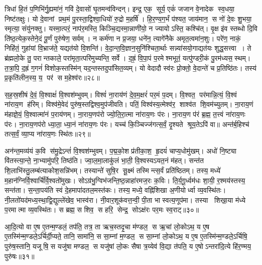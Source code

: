 त्रिधा॑ हि॒तं प॒णिभि॑र्गु॒ह्यमा॑नं॒ गवि॑ दे॒वासो॑ घृ॒तमन्व॑विन्दन्। 
इन्द्र॒ एक॒ सूर्य॒ एकं॑ जजान वे॒नादेक स्व॒धया॒ निष्ट॑तक्षुः। 
यो दे॒वानां प्रथ॒मं पु॒रस्ता॒द्विश्वा॒धियो॑ रु॒द्रो म॒हर्\mbox{}षि॑। 
हि॒र॒ण्य॒ग॒र्भं प॑श्यत॒ जाय॑मान॒ स नो॑ दे॒वः शु॒भया॒ स्मृत्या॒ संयु॑नक्तु। 
यस्मा॒त्परं॒ नाप॑र॒मस्ति॒ किञ्चि॒द्यस्मा॒न्नाणी॑यो॒ न ज्यायोऽस्ति॒ कश्चि॑त्। 
वृ॒क्ष इ॑व स्तब्धो दि॒वि ति॑ष्ठ॒त्येक॒स्तेने॒दं पू॒र्णं पुरु॑षेण॒ सर्वम्। 
न कर्म॑णा न प्र॒जया॒ धने॑न॒ त्यागे॑नैके अमृत॒त्वमा॑न॒शुः। 
परे॑ण॒ नाकं॒ निहि॑तं॒ गुहा॑यां वि॒भ्राज॑ते॒ यद्यत॑यो वि॒शन्ति॑। 
वे॒दा॒न्त॒वि॒ज्ञान॒सुनि॑श्चिता॒र्थाः सन्न्या॑सयो॒गाद्यत॑यः शुद्ध॒सत्त्वा। 
ते ब्र॑ह्मलो॒के तु॒ परान्तकाले॒ परा॑मृता॒त्परि॑मुच्यन्ति॒ सर्वे। 
द॒ह्रं॒ वि॒पा॒पं प॒रमेश्मभूतं॒ यत्पु॑ण्डरी॒कं पु॒रम॑ध्यस॒स्थम्। 
त॒त्रा॒पि॒ द॒ह्रं ग॒गनं॑ विशोक॒स्तस्मि॑न् यद॒न्तस्तदुपा॑सित॒व्यम्। 
यो वेदादौ स्व॑रः प्रो॒क्तो॒ वे॒दान्ते॑ च प्र॒तिष्ठि॑तः। 
तस्य॑ प्र॒कृति॑लीन॒स्य॒ य॒ पर॑ स म॒हेश्व॑रः॥२८॥
\anuvakamend

स॒ह॒स्र॒शी\sr{}षं दे॒वं॒ वि॒श्वाक्षं॑ वि॒श्वश॑म्भुवम्। 
विश्वं॑ ना॒राय॑णं दे॒व॒म॒क्षरं॑ पर॒मं प॒दम्। 
वि॒श्वत॒ पर॑मान्नि॒त्यं॒ वि॒श्वं ना॑राय॒ण ह॑रिम्। 
विश्व॑मे॒वेदं पुरु॑ष॒स्तद्विश्व॒मुप॑जीवति। 
पतिं॒ विश्व॑स्य॒\aav{}\aav{}त्मेश्व॑र॒ शाश्व॑त शि॒वम॑च्युतम्। 
ना॒राय॒णं म॑हाज्ञे॒यं॒ वि॒श्वात्मा॑नं प॒राय॑णम्। 
ना॒राय॒णप॑रो ज्यो॒ति॒रा॒त्मा ना॑राय॒णः प॑रः। 
ना॒राय॒ण प॑रं ब्र॒ह्म॒ त॒त्त्वं ना॑राय॒णः प॑रः। 
ना॒राय॒णप॑रो ध्या॒ता॒ ध्या॒नं ना॑राय॒णः प॑रः। 
यच्च॑ कि॒ञ्चिज्ज॑गत्स॒र्वं॒ दृ॒श्यते श्रूय॒तेऽपि॑ वा॥ 
अन्त॑र्ब॒हिश्च॑ तत्स॒र्वं॒ व्या॒प्य ना॑राय॒णः स्थि॑तः॥२९॥

अन॑न्त॒मव्य॑यं क॒वि स॑मु॒द्रेऽन्तं॑ वि॒श्वश॑म्भुवम्। 
प॒द्म॒को॒श प्र॑तीका॒श॒ हृ॒दयं॑ चाप्य॒धोमु॑खम्। 
अधो॑ नि॒ष्ट्या वि॑तस्त्या॒न्ते॒ ना॒भ्यामु॑परि॒ तिष्ठ॑ति। 
ज्वा॒ल॒मा॒लाकु॑लं भा॒ती॒ वि॒श्वस्यऽ\sav{}यत॒नं म॑हत्। 
सन्त॑त शि॒लाभि॑स्तु॒\-लम्ब॑त्याकोश॒सन्नि॑भम्। 
तस्यान्ते॑ सुषि॒र सू॒क्ष्मं तस्मिन्त्स॒र्वं प्रति॑ष्ठितम्। 
तस्य॒ मध्ये॑ म॒हान॑\-ग्निर्वि॒श्वार्चि॑र्वि॒श्वतो॑मुखः। 
सोऽग्र॑भु॒ग्विभ॑जन्ति॒ष्ठ॒न्नाहा॑रमज॒रः क॒विः। 
ति॒र्य॒गू॒र्ध्वम॑धः शा॒यी॒ र॒श्मय॑स्तस्य॒ सन्त॑ता। 
स॒न्ता॒पय॑ति स्वं दे॒हमापा॑द\-तल॒\-मस्त॑कः। 
तस्य॒ मध्ये॒ वह्नि॑शिखा अ॒णीयोर्ध्वा व्य॒वस्थि॑तः। 
नी॒लतो॑यद॑\-मध्य॒स्था॒द्वि॒द्युल्ले॑खेव॒ भास्व॑रा। 
नी॒वार॒शूक॑वत्त॒न्वी॒ पी॒ता भास्वत्य॒णूप॑मा। 
तस्या शिखा॒या म॑ध्ये प॒रमात्मा व्य॒वस्थि॑तः। 
स ब्रह्म॒ स शिव॒ स हरि॒ सेन्द्र॒ सोऽक्ष॑रः पर॒मः स्व॒राट्॥३०॥
\anuvakamend[ना॒रा॒य॒णः स्थि॑तो व्य॒वस्थि॑तश्च॒त्वारि॑ च]

आ॒दि॒त्यो वा ए॒ष ए॒तन्म॒ण्डलं॒ तप॑ति॒ तत्र॒ ता ऋच॒स्तदृ॒चा म॑ण्डल॒ स ऋ॒चां लो॒कोऽथ॒ य ए॒ष ए॒तस्मि॑न्म॒ण्डले॒ऽर्चिर्दी॒प्यते॒ तानि॒ सामा॑नि॒ स सा॒म्नां म॒ण्डल॒ स सा॒म्नां लो॒कोऽथ॒ य ए॒ष ए॒तस्मि॑न्म॒ण्डले॒ऽर्चिषि॒ पुरु॑ष॒स्तानि॒ यजूषि॒ स यजु॑षा मण्डल॒ स यजु॑षां लो॒कः सैषा त्र॒य्येव॑ वि॒द्या त॑पति॒ य ए॒षोऽन्तरा॑दि॒त्ये हि॑र॒ण्मय॒ पुरु॑षः॥३१॥
\anuvakamend


